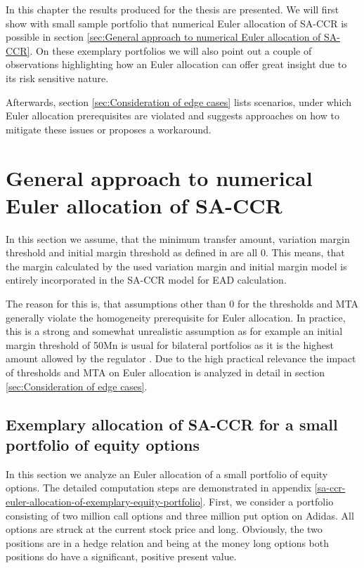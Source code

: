 \documentclass[../Thesis_AHoecherl.tex]{subfiles}
\begin{document}
    In this chapter the results produced for the thesis are presented. We will first show with small sample portfolio that numerical Euler allocation of SA-CCR is possible in section \ref{sec:General approach to numerical Euler allocation of SA-CCR}. On these exemplary portfolios we will also point out a couple of observations highlighting how an Euler allocation can offer great insight due to its risk sensitive nature.

    Afterwards, section \ref{sec:Consideration of edge cases} lists scenarios, under which Euler allocation prerequisites are violated and suggests approaches on how to mitigate these issues or proposes a workaround.

    \section{General approach to numerical Euler allocation of SA-CCR\label{sec:General approach to numerical Euler allocation of SA-CCR}}

    In this section we assume, that the minimum transfer amount, variation margin threshold and initial margin threshold as defined in  are all 0. This means, that the margin calculated by the used variation margin and initial margin model is entirely incorporated in the SA-CCR model for EAD calculation.

    The reason for this is, that assumptions other than 0 for the thresholds and MTA generally violate the homogeneity prerequisite for Euler allocation. In practice, this is a strong and somewhat unrealistic assumption as for example an initial margin threshold of 50Mn is usual for bilateral portfolios as it is the highest amount allowed by the regulator . Due to the high practical relevance the impact of thresholds and MTA on Euler allocation is analyzed in detail in section \ref{sec:Consideration of edge cases}.   

    \subsection{Exemplary allocation of SA-CCR for a small portfolio of equity options}

    In this section we analyze an Euler allocation of a small portfolio of equity options. The detailed computation steps are demonstrated in appendix \ref{sa-ccr-euler-allocation-of-exemplary-equity-portfolio}. 
    First, we consider a portfolio consisting of two million call options and three million put option on Adidas. All options are struck at the current stock price and long. Obviously, the two positions are in a hedge relation and being at the money long options both positions do have a significant, positive present value.
    
\end{document}
